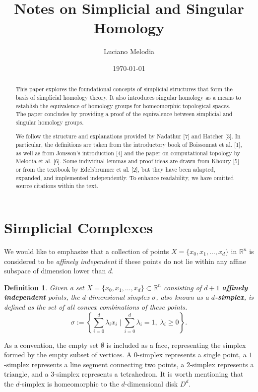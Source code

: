 \documentclass{amsart}
\title{Notes on Simplicial and Singular Homology}
\author[Luciano Melodia]{Luciano Melodia}
\date{\today}
\newtheorem{definition}{Definition}[section]
\begin{document}
\makeatletter
\makeatother
\maketitle

\begin{abstract}
This paper explores the foundational concepts of simplicial structures that form the basis of simplicial homology theory. It also introduces singular homology as a means to establish the equivalence of homology groups for homeomorphic topological spaces. The paper concludes by providing a proof of the equivalence between simplicial and singular homology groups.

We follow the structure and explanations provided by Nadathur [7] and Hatcher [3]. In particular, the definitions are taken from the introductory book of Boissonnat et al. [1], as well as from Jonsson's introduction [4] and the paper on computational topology by Melodia et al. [6]. Some individual lemmas and proof ideas are drawn from Khoury [5] or from the textbook by Edelsbrunner et al. [2], but they have been adapted, expanded, and implemented independently. To enhance readability, we have omitted source citations within the text.
\end{abstract}

\section{Simplicial Complexes}
We would like to emphasize that a collection of points $X = \{x_0, x_1, \ldots, x_d\}$ in $\mathbb{R}^n$ is considered to be \emph{affinely independent} if these points do not lie within any affine subspace of dimension lower than $d$.

\begin{definition}
Given a set $X = \{x_0, x_1, \ldots, x_d\} \subset \mathbb{R}^n$ consisting of $d+1$ \textbf{affinely independent} points, the $d$-dimensional simplex $\sigma$, also known as a \textbf{\emph{$d$-simplex}}, is defined as the set of all convex combinations of these points.
\begin{equation}
	\sigma := \left\{\sum_{i=0}^{d} \lambda_i x_i \; \vert \; \sum_{i=0}^{d} \lambda_i = 1, \; \lambda_i \geq 0 \right\}.
\end{equation}
\end{definition}

As a convention, the empty set $\emptyset$ is included as a face, representing the simplex formed by the empty subset of vertices. A $0$-simplex represents a single point, a $1$-simplex represents a line segment connecting two points, a $2$-simplex represents a triangle, and a $3$-simplex represents a tetrahedron. It is worth mentioning that the $d$-simplex is homeomorphic to the $d$-dimensional disk $D^d$.
\end{document}
